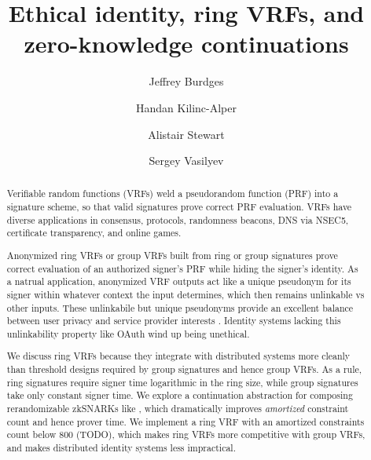 \documentclass[runningheads,evcountsame,a4paper,11pt,orivec]{llncs}
\title{Ethical identity, ring VRFs, and zero-knowledge continuations}
\author{Jeffrey Burdges \and Handan Kilinc-Alper \and Alistair Stewart \and Sergey Vasilyev}
\date{}
\institute{Web 3.0 Foundation}
\begin{document}
	
\maketitle

\begin{abstract}
Verifiable random functions (VRFs) weld a pseudorandom function (PRF) into a signature scheme, so that valid signatures prove correct PRF evaluation.  VRFs have diverse applications in consensus, protocols, randomness beacons, DNS via NSEC5, certificate transparency, and online games.

Anonymized ring VRFs or group VRFs built from ring or group signatures prove correct evaluation of an authorized signer's PRF while hiding the signer's identity.
As a natrual application, anonymized VRF outputs act like a unique pseudonym for its signer within whatever context the input determines, which then remains unlinkable vs other inputs.  These unlinkabile but unique pseudonyms provide an excellent balance between user privacy and service provider interests \cite{pop2008}.  Identity systems lacking this unlinkability property like OAuth wind up being unethical.

We discuss ring VRFs because they integrate with distributed systems more cleanly than threshold designs required by  group signatures and hence group VRFs.  As a rule, ring signatures require signer time logarithmic in the ring size, while group signatures take only constant signer time.  
%
We explore a continuation abstraction for composing rerandomizable zkSNARKs like \cite{groth16}, which dramatically improves {\it amortized} constraint count and hence prover time.  We implement a ring VRF with an amortized constraints count below 800 (TODO), which makes ring VRFs more competitive with group VRFs, and makes distributed identity systems less impractical.  
\end{abstract}



% 













\end{document}
